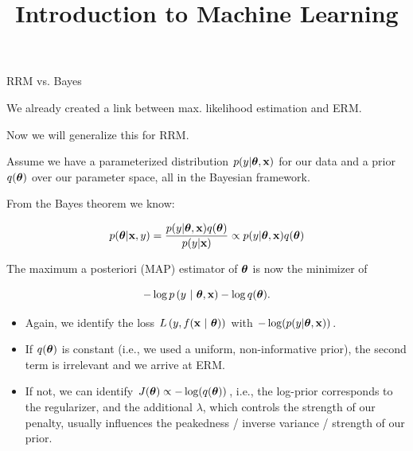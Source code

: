 \documentclass[11pt,compress,t,notes=noshow, xcolor=table]{beamer}
\title{Introduction to Machine Learning}
\date{}
\begin{document}



\begin{vbframe} {RRM vs. Bayes}

We already created a link between max. likelihood estimation and ERM.

\lz 

Now we will generalize this for RRM.

\lz

Assume we have a parameterized distribution $p(y | \bm{\theta}, \mathbf{x})$ for our data and 
a prior $q(\bm{\theta})$ over our parameter space, all in the Bayesian framework.

\lz 

From the Bayes theorem we know:

$$
p(\bm{\theta} | \mathbf{x}, y) = \frac{p(y | \bm{\theta}, \mathbf{x}) q(\bm{\theta}) }{p(y | \mathbf{x})} \propto 
p(y | \bm{\theta}, \mathbf{x}) q(\bm{\theta})
$$

\framebreak

The maximum a posteriori (MAP) estimator of $\bm{\theta}$ is now the minimizer of

$$
- \log p\left(y ~|~ \bm{\theta}, \mathbf{x}\right) - \log q(\bm{\theta}).
$$

\begin{itemize}
  \item Again, we identify the loss $L\left(y, f(\mathbf{x} ~|~ \bm{\theta})\right)$ with $-\log(p(y | \bm{\theta}, \mathbf{x}))$.
  \item If $q(\bm{\theta})$ is constant (i.e., we used a uniform, non-informative 
  prior), the second term is irrelevant and we arrive at ERM.
  \item If not, we can identify $J(\bm{\theta}) \propto -\log(q(\bm{\theta}))$, i.e., 
  the log-prior corresponds to the regularizer, and the additional $\lambda$, which controls the strength of our
  penalty, usually influences the peakedness / inverse variance / strength of our prior.
\end{itemize}

\framebreak

\begin{figure}
  \centering
\end{figure}


\end{vbframe}
\end{document}
